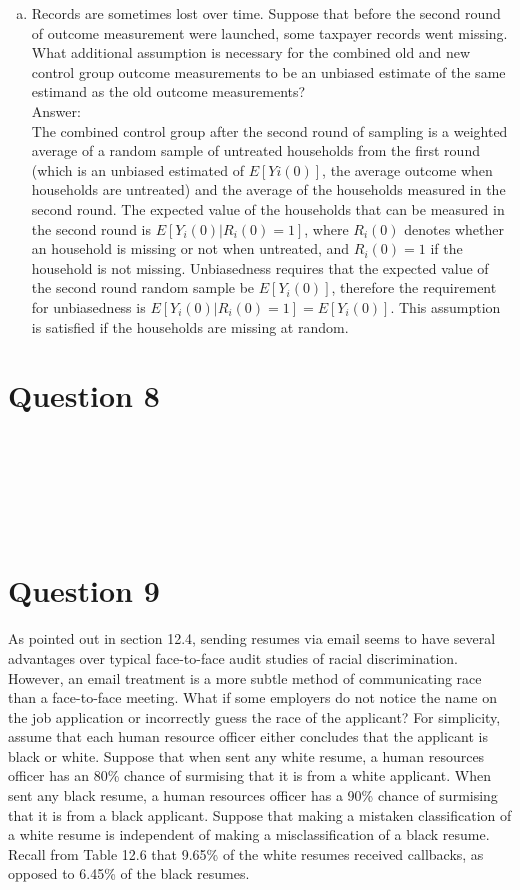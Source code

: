 \documentclass[11pt,notitlepage]{article}\usepackage[]{graphicx}\usepackage[]{color}
\makeatletter
\newenvironment{kframe}{%
 \def\at@end@of@kframe{}%
 \ifinner\ifhmode%
  \def\at@end@of@kframe{\end{minipage}}%
  \begin{minipage}{\columnwidth}%
 \fi\fi%
 \def\FrameCommand##1{\hskip\@totalleftmargin \hskip-\fboxsep
 \colorbox{shadecolor}{##1}\hskip-\fboxsep
     \hskip-\linewidth \hskip-\@totalleftmargin \hskip\columnwidth}%
 \MakeFramed {\advance\hsize-\width
   \@totalleftmargin\z@ \linewidth\hsize
   \@setminipage}}%
 {\par\unskip\endMakeFramed%
 \at@end@of@kframe}
\newenvironment{knitrout}{}{} %
\makeatother
\begin{document}
\begin{enumerate}[a)]
\item Records are sometimes lost over time. Suppose that before the second round of outcome measurement were launched, some taxpayer records went missing. What additional assumption is necessary for the combined old and new control group outcome measurements to be an unbiased estimate of the same estimand as the old outcome measurements?\\
Answer:\\
The combined control group after the second round of sampling is a weighted average of a random sample of untreated households from the first round (which is an unbiased estimated of $E[Yi(0)]$, the average outcome when households are untreated) and the average of the households measured in the second round. The expected value of the households that can be measured in the second round is $E[Y_i(0)|R_i(0)=1]$, where $R_i(0)$ denotes whether an household is missing or not when untreated, and $R_i(0)=1$ if the household is not missing. Unbiasedness requires that the expected value of the second round random sample be $E[Y_i(0)]$, therefore the requirement for unbiasedness is $E[Y_i(0)|R_i(0)=1] = E[Y_i(0)]$. This assumption is satisfied if the households are missing at random. 
\end{enumerate}
\section*{Question 8}
\begin{knitrout}
\color{fgcolor}\begin{kframe}
\begin{verbatim}






\end{verbatim}
\end{kframe}
\end{knitrout}



\section*{Question 9}
As pointed out in section 12.4, sending resumes via email seems to have several advantages over typical face-to-face audit studies of racial discrimination. However, an email treatment is a more subtle method of communicating race than a face-to-face meeting. What if some employers do not notice the name on the job application or incorrectly guess the race of the applicant? For simplicity, assume that each human resource officer either concludes that the applicant is black or white. Suppose that when sent any white resume, a human resources officer has an 80\% chance of surmising that it is from a white applicant. When sent any black resume, a human resources officer has a 90\% chance of surmising that it is from a black applicant. Suppose that making a mistaken classification of a white resume is independent of making a misclassification of a black resume. Recall from Table 12.6 that 9.65\% of the white resumes received callbacks, as opposed to 6.45\% of the black resumes.
\end{document}
